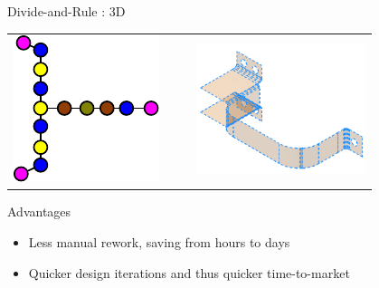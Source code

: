 \documentclass[final]{beamer}
\newlength{\onecolumnwidth}
\begin{document}
\begin{frame}[t]
\begin{columns}[t]
\begin{column}{\onecolumnwidth}
\begin{block}{Divide-and-Rule : 3D}
\begin{center}
\begin{tabular}[h]{@{}p{0.4\linewidth} p{0.4\linewidth} @{}}
			\includegraphics[width=0.8\linewidth]{../Common/images/CellGraphBracket.pdf} &  
			\includegraphics[width=0.8\linewidth]{../Common/images/midsCellularBracket} 	\\ 
			
		\end{tabular}	
		\end{center}
		\vspace{-1em}
	\end{block}
		
	\begin{block}{Advantages}
	
		\begin{itemize}
		
			\item Less manual rework, saving from hours to days
			\item Quicker design iterations and thus quicker time-to-market
			

\end{itemize}
\end{block}
\end{column}
\end{columns}
\end{frame}
\end{document}
